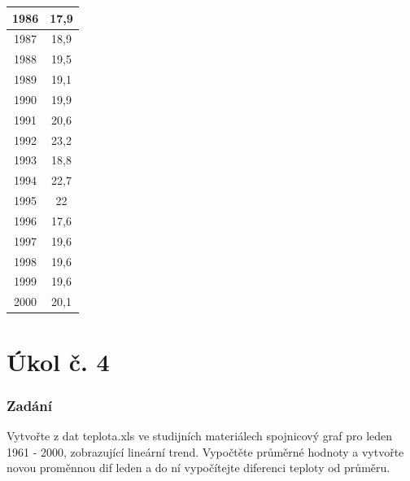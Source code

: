 \documentclass{article}
\begin{document}
\begin{table}[p]
\begin{tabular}{|c|c|}
 		\hline \rule[-1ex]{0pt}{3.5ex} 1986   &   17,9 \\ 
 		\hline \rule[-1ex]{0pt}{3.5ex} 1987   &   18,9 \\ 
 		\hline \rule[-1ex]{0pt}{3.5ex} 1988   &   19,5 \\ 
 		\hline \rule[-1ex]{0pt}{3.5ex} 1989   &   19,1 \\ 
 		\hline \rule[-1ex]{0pt}{3.5ex} 1990   &   19,9 \\ 
 		\hline \rule[-1ex]{0pt}{3.5ex} 1991   &   20,6 \\ 
 		\hline \rule[-1ex]{0pt}{3.5ex} 1992   &   23,2 \\ 
 		\hline \rule[-1ex]{0pt}{3.5ex} 1993   &   18,8 \\ 
 		\hline \rule[-1ex]{0pt}{3.5ex} 1994   &   22,7 \\ 
 		\hline \rule[-1ex]{0pt}{3.5ex} 1995   &   22   \\  
 		\hline \rule[-1ex]{0pt}{3.5ex} 1996   &   17,6 \\ 
 		\hline \rule[-1ex]{0pt}{3.5ex} 1997   &   19,6 \\ 
 		\hline \rule[-1ex]{0pt}{3.5ex} 1998   &   19,6 \\ 
 		\hline \rule[-1ex]{0pt}{3.5ex} 1999   &   19,6 \\ 
 		\hline \rule[-1ex]{0pt}{3.5ex} 2000   &   20,1 \\ 
 		\hline 
 	\end{tabular} 
 	\label{fig:tab1}
 \end{table}
	
\newpage
	\maketitle %
	 	
	 	
	 \part*{Úkol č. 4}
	 \section*{Zadání} %
	 	
	 	Vytvořte z dat teplota.xls ve studijních materiálech spojnicový graf pro leden 1961 - 2000, zobrazující lineární trend. Vypočtěte průměrné hodnoty a vytvořte novou proměnnou dif leden a do ní vypočítejte diferenci teploty od průměru. 
	 	
\end{document}

